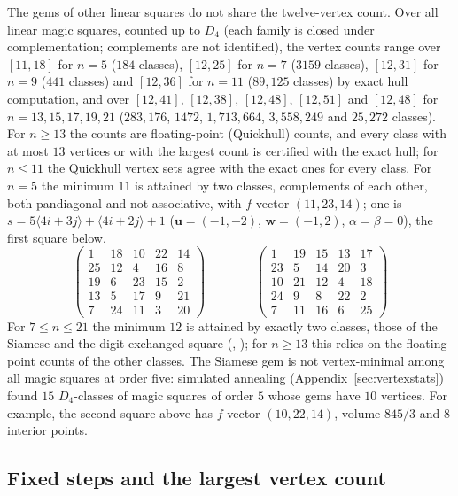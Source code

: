 \begin{remark}
\label{rem:linear}
The gems of other linear squares do not share the twelve-vertex count.
Over all linear magic squares, counted up to $D_4$ (each family is closed under complementation; complements are not identified), the vertex counts range over $[11,18]$ for $n=5$ ($184$ classes), $[12,25]$ for $n=7$ ($3159$ classes), $[12,31]$ for $n=9$ ($441$ classes) and $[12,36]$ for $n=11$ ($89{,}125$ classes) by exact hull computation, and over $[12,41]$, $[12,38]$, $[12,48]$, $[12,51]$ and $[12,48]$ for $n=13,15,17,19,21$ ($283{,}176$, $1472$, $1{,}713{,}664$, $3{,}558{,}249$ and $25{,}272$ classes).
For $n\ge13$ the counts are floating-point (Quickhull) counts, and every class with at most $13$ vertices or with the largest count is certified with the exact hull; for $n\le11$ the Quickhull vertex sets agree with the exact ones for every class.
For $n=5$ the minimum $11$ is attained by two classes, complements of each other, both pandiagonal and not associative, with $f$-vector $(11,23,14)$; one is $s=5\langle4i+3j\rangle+\langle4i+2j\rangle+1$ ($\mathbf u=(-1,-2)$, $\mathbf w=(-1,2)$, $\alpha=\beta=0$), the first square below.
\[
\begin{pmatrix}1&18&10&22&14\\25&12&4&16&8\\19&6&23&15&2\\13&5&17&9&21\\7&24&11&3&20\end{pmatrix}
\qquad\qquad
\begin{pmatrix}1&19&15&13&17\\23&5&14&20&3\\10&21&12&4&18\\24&9&8&22&2\\7&11&16&6&25\end{pmatrix}
\]
For $7\le n\le21$ the minimum $12$ is attained by exactly two classes, those of the Siamese and the digit-exchanged square (, ); for $n\ge13$ this relies on the floating-point counts of the other classes.
The Siamese gem is not vertex-minimal among all magic squares at order five: simulated annealing (Appendix~\ref{sec:vertexstats}) found $15$ $D_4$-classes of magic squares of order $5$ whose gems have $10$ vertices. For example, the second square above has $f$-vector $(10,22,14)$, volume $845/3$ and $8$ interior points.
\end{remark}

\subsection{Fixed steps and the largest vertex count}
\label{sec:fixed-steps}

